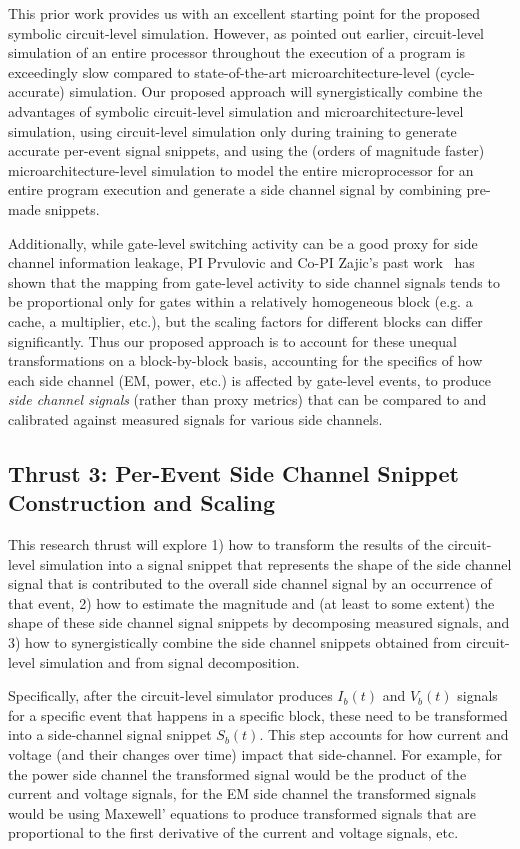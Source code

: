 This prior work provides us with an excellent starting point for the proposed symbolic circuit-level simulation. However, as pointed out earlier, circuit-level simulation of an entire processor throughout the execution of a program is exceedingly slow compared to state-of-the-art microarchitecture-level (cycle-accurate) simulation. Our proposed approach will synergistically combine the advantages of symbolic circuit-level simulation and microarchitecture-level simulation, using circuit-level simulation only during training to generate accurate per-event signal snippets, and using the (orders of magnitude faster) microarchitecture-level simulation to model the entire microprocessor for an entire program execution and generate a side channel signal by combining pre-made snippets.

Additionally, while gate-level switching activity can be a good proxy for side channel information leakage, PI Prvulovic and Co-PI Zajic's past work~\cite{Nader2020} has shown that the mapping from gate-level activity to side channel signals tends to be proportional only for gates within a relatively homogeneous block (e.g. a cache, a multiplier, etc.), but the scaling factors for different blocks can differ significantly. Thus our proposed approach is to account for these unequal transformations on a block-by-block basis, accounting for the specifics of how each side channel (EM, power, etc.) is affected by gate-level events, to produce {\em side channel signals} (rather than proxy metrics) that can be compared to and calibrated against measured signals for various side channels.

\subsection{Thrust 3: Per-Event Side Channel Snippet Construction and Scaling}
\label{sec:proposed-transform}

This research thrust will explore 1) how to transform the results of the circuit-level simulation into a signal snippet that represents the shape of the side channel signal that is contributed to the overall side channel signal by an occurrence of that event, 2) how to estimate the magnitude and (at least to some extent) the shape of these side channel signal snippets by decomposing measured signals, and 3) how to synergistically combine the side channel snippets obtained from circuit-level simulation and from signal decomposition.

Specifically, after the circuit-level simulator produces $I_b(t)$ and $V_b(t)$ signals for a specific event that happens in a specific block, these need to be transformed into a side-channel signal snippet $S_b(t)$. This step accounts for how current and voltage (and their changes over time) impact that side-channel. For example, for the power side channel the transformed signal would be the product of the current and voltage signals, for the EM side channel the transformed signals would be using Maxewell' equations to produce transformed signals that are proportional to the first derivative of the current and voltage signals, etc.

